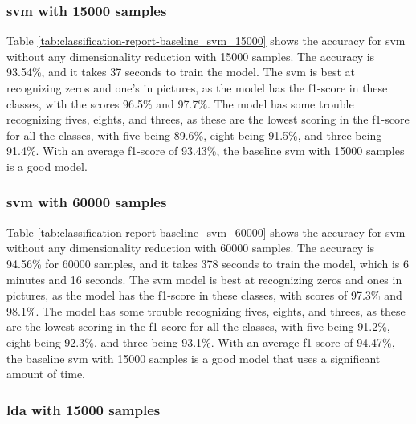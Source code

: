 \subsubsection{\gls{svm} with 15000 samples}\label{subsubsec:experiment-1-results-svm-15000}

Table \ref{tab:classification-report-baseline_svm_15000} shows the accuracy for \gls{svm} without any dimensionality reduction with 15000 samples. The accuracy is 93.54\%, and it takes 37 seconds to train the model. The \gls{svm} is best at recognizing zeros and one's in pictures, as the model has the f1-score in these classes, with the scores 96.5\% and 97.7\%. The model has some trouble recognizing fives, eights, and threes, as these are the lowest scoring in the f1-score for all the classes, with five being 89.6\%, eight being 91.5\%, and three being 91.4\%. With an average f1-score of 93.43\%, the baseline \gls{svm} with 15000 samples is a good model. 

\subsubsection{\gls{svm} with 60000 samples}\label{subsubsec:experiment-1-results-svm-60000}

Table \ref{tab:classification-report-baseline_svm_60000} shows the accuracy for \gls{svm} without any dimensionality reduction with 60000 samples. The accuracy is 94.56\% for 60000 samples, and it takes 378 seconds to train the model, which is 6 minutes and 16 seconds. The \gls{svm} model is best at recognizing zeros and ones in pictures, as the model has the f1-score in these classes, with scores of 97.3\% and 98.1\%. The model has some trouble recognizing fives, eights, and threes, as these are the lowest scoring in the f1-score for all the classes, with five being 91.2\%, eight being 92.3\%, and three being 93.1\%. With an average f1-score of 94.47\%, the baseline \gls{svm} with 15000 samples is a good model that uses a significant amount of time.

\subsubsection{\gls{lda} with 15000 samples}\label{subsubsec:experiment-1-results-lda-15000}

